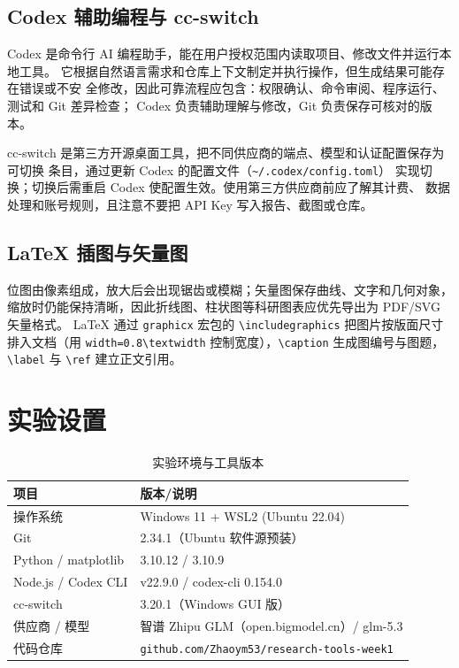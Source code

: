 \documentclass{SYSUReport}
\begin{document}
\subsection{Codex 辅助编程与 cc-switch}

Codex 是命令行 AI 编程助手，能在用户授权范围内读取项目、修改文件并运行本地工具。
它根据自然语言需求和仓库上下文制定并执行操作，但生成结果可能存在错误或不安
全修改，因此可靠流程应包含：权限确认、命令审阅、程序运行、测试和 Git 差异检查；
Codex 负责辅助理解与修改，Git 负责保存可核对的版本。

cc-switch 是第三方开源桌面工具，把不同供应商的端点、模型和认证配置保存为可切换
条目，通过更新 Codex 的配置文件（\texttt{\textasciitilde/.codex/config.toml}）
实现切换；切换后需重启 Codex 使配置生效。使用第三方供应商前应了解其计费、
数据处理和账号规则，且注意不要把 API Key 写入报告、截图或仓库。

\subsection{LaTeX 插图与矢量图}

位图由像素组成，放大后会出现锯齿或模糊；矢量图保存曲线、文字和几何对象，
缩放时仍能保持清晰，因此折线图、柱状图等科研图表应优先导出为 PDF/SVG 矢量格式。
LaTeX 通过 \texttt{graphicx} 宏包的 \texttt{\textbackslash includegraphics}
把图片按版面尺寸排入文档（用 \texttt{width=0.8\textbackslash textwidth}
控制宽度），\texttt{\textbackslash caption} 生成图编号与图题，
\texttt{\textbackslash label} 与 \texttt{\textbackslash ref} 建立正文引用。

\section{实验设置}

\begin{table}[htbp]
  \centering
  \caption{实验环境与工具版本}
  \label{tab:env}
  \begin{tabular}{ll}
    \toprule
    项目 & 版本/说明 \\
    \midrule
    操作系统 & Windows 11 + WSL2 (Ubuntu 22.04) \\
    Git & 2.34.1（Ubuntu 软件源预装） \\
    Python / matplotlib & 3.10.12 / 3.10.9 \\
    Node.js / Codex CLI & v22.9.0 / codex-cli 0.154.0 \\
    cc-switch & 3.20.1（Windows GUI 版） \\
    供应商 / 模型 & 智谱 Zhipu GLM（open.bigmodel.cn）/ glm-5.3 \\
    代码仓库 & \texttt{github.com/Zhaoym53/research-tools-week1} \\
    \bottomrule
  \end{tabular}
\end{table}
\end{document}
